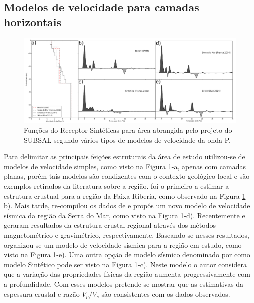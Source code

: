 \subsection{Modelos de velocidade para camadas horizontais}

\begin{figure}[!ht]
\centering
\includegraphics[scale=0.22]{Figs/modelagem_RF.png}
\caption{Funções do Receptor Sintéticas para área abrangida pelo projeto do SUBSAL segundo vários tipos de modelos de velocidade da onda P.}
\label{modelagem}
\end{figure}

Para delimitar as principais feições estruturais da área de estudo utilizou-se de modelos de velocidade simples, como visto na Figura \ref{modelagem}-a, apenas com camadas planas, porém tais modelos são condizentes com o contexto geológico local e são exemplos retirados da literatura sobre a região. \cite{Bassini_1986} foi o primeiro a estimar a estrutura crustual para a região da Faixa Riberia, como observado na Figura \ref{modelagem}-b). Mais tarde, \cite{sand_franca_crustal_2004} re-compilou os dados de \cite{Bassini_1986} e propôs um novo modelo de velocidade sísmica da região da Serra do Mar, como visto na Figura \ref{modelagem}-d). Recentemente \cite{flora_solon_ancient_2013} e \cite{Silva_2014} geraram resultados da estrutura crustal regional através dos métodos magnetométrico e gravimétrico, respectivamente. Baseando-se nesses resultados, organizou-se um modelo de velocidade sísmica para a região em estudo, como visto na Figura \ref{modelagem}-e). Uma outra opção de modelo sísmico denominado por \cite{sand_franca_crustal_2004} como modelo Sintético pode ser visto na Figura \ref{modelagem}-c). Neste modelo o autor considera que a variação das propriedades físicas da região aumenta progressivamente com a profundidade.
Com esses modelos pretende-se mostrar que as estimativas da espessura crustal e razão $V_{p}/V_{s}$ são consistentes com os dados observados.


